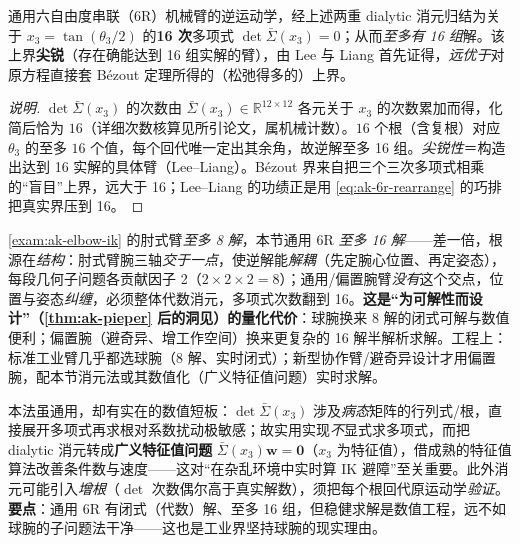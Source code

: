 \begin{theorem}\label{thm:ak-6r-bound}
通用六自由度串联（6R）机械臂的逆运动学，经上述两重 dialytic 消元归结为关于 $x_3=\tan(\theta_3/2)$ 的\textbf{16 次}多项式 $\det\bar{\Sigma}(x_3)=0$；从而\emph{至多有 16 组}解。该上界\textbf{尖锐}（存在确能达到 16 组实解的臂），由 Lee 与 Liang 首先证得，\emph{远优于}对原方程直接套 Bézout 定理所得的（松弛得多的）上界\cite{lee1988displacement,manocha1994realtime}。
\end{theorem}
\begin{proof}[说明]
$\det\bar{\Sigma}(x_3)$ 的次数由 $\bar{\Sigma}(x_3)\in\mathbb{R}^{12\times12}$ 各元关于 $x_3$ 的次数累加而得，化简后恰为 $16$（详细次数核算见所引论文，属机械计数）。$16$ 个根（含复根）对应 $\theta_3$ 的至多 $16$ 个值，每个回代唯一定出其余角，故逆解至多 16 组。\emph{尖锐性}＝构造出达到 16 实解的具体臂（Lee--Liang）。Bézout 界来自把三个三次多项式相乘的“盲目”上界，远大于 16；Lee--Liang 的功绩正是用 \cref{eq:ak-6r-rearrange} 的巧排把真实界压到 16。
\end{proof}

\begin{insight}\label{ins:ak-8-vs-16}
\cref{exam:ak-elbow-ik} 的肘式臂\emph{至多 8 解}，本节通用 6R \emph{至多 16 解}——差一倍，根源在\emph{结构}：肘式臂腕三轴\emph{交于一点}，使逆解能\emph{解耦}（先定腕心位置、再定姿态），每段几何子问题各贡献因子 2（$2\times2\times2=8$）；通用/偏置腕臂\emph{没有}这个交点，位置与姿态\emph{纠缠}，必须整体代数消元，多项式次数翻到 16。\textbf{这是“为可解性而设计”（\cref{thm:ak-pieper} 后的洞见）的量化代价}：球腕换来 8 解的闭式可解与数值便利；偏置腕（避奇异、增工作空间）换来更复杂的 16 解半解析求解。工程上：标准工业臂几乎都选球腕（8 解、实时闭式）；新型协作臂/避奇异设计才用偏置腕，配本节消元法或其数值化（广义特征值问题）实时求解\cite{manocha1994realtime}。
\end{insight}

\begin{note}[消元法的工程软肋]\label{note:ak-elim-caveat}
本法虽通用，却有实在的数值短板\cite{manocha1994realtime}：$\det\bar{\Sigma}(x_3)$ 涉及\emph{病态}矩阵的行列式/根，直接展开多项式再求根对系数扰动极敏感；故实用实现\emph{不}显式求多项式，而把 dialytic 消元转成\textbf{广义特征值问题} $\bar{\Sigma}(x_3)\mathbf{w}=\mathbf{0}$（$x_3$ 为特征值），借成熟的特征值算法改善条件数与速度——这对“在杂乱环境中实时算 IK 避障”至关重要。此外消元可能引入\emph{增根}（$\det$ 次数偶尔高于真实解数），须把每个根回代原运动学\emph{验证}。\textbf{要点}：通用 6R 有闭式（代数）解、至多 16 组，但稳健求解是数值工程，远不如球腕的子问题法干净——这也是工业界坚持球腕的现实理由。
\end{note}

